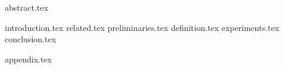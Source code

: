 \documentclass[a4paper,UKenglish,cleveref, autoref]{oasics-v2019}
\begin{document}
\maketitle
{abstract.tex}

{introduction.tex}
{related.tex}
{preliminaries.tex}
{definition.tex}
{experiments.tex}
{conclusion.tex}
\iflncs

\else

\fi


\newpage
{appendix.tex}
\end{document}
